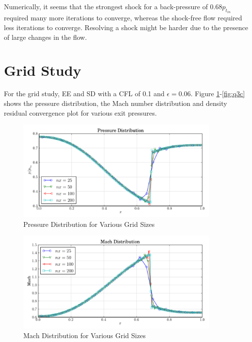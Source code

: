 \documentclass[letterpaper,12pt,]{article}
\begin{document}
Numerically, it seems that the strongest shock for a back-pressure of $0.68p_{t_{in}}$ required many more iterations to converge, whereas the shock-free flow required less iterations to converge.
Resolving a shock might be harder due to the presence of large changes in the flow.

\section{Grid Study}

For the grid study, EE and SD with a CFL of 0.1 and $\epsilon = 0.06$.
Figure \ref{fig:q3p}-\ref{fig:q3c} shows the pressure distribution, the Mach number distribution and density residual convergence plot for various exit pressures.

\begin{figure}[!ht]
    \centering
    \includegraphics[width = 0.9\textwidth]{./figures/q3p.pdf}
    \caption {Pressure Distribution for Various Grid Sizes}
    \label{fig:q3p}
\end{figure}

\begin{figure}[!ht]
    \centering
    \includegraphics[width = 0.9\textwidth]{./figures/q3m.pdf}
    \caption {Mach Distribution for Various Grid Sizes}
    \label{fig:q3m}
\end{figure}
\end{document}
